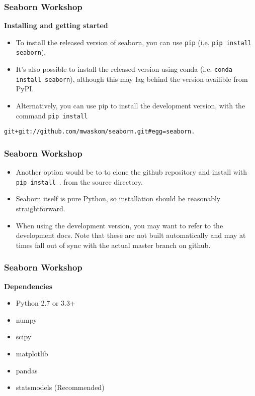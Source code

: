 \documentclass{beamer}
\begin{document}
\begin{frame}[fragile]
\frametitle{Seaborn Workshop}
\large
\textbf{Installing and getting started}
\begin{itemize}
\item To install the released version of seaborn, you can use \texttt{pip} (i.e. \texttt{pip install seaborn}). 
\item It’s also possible to install the released version using conda (i.e. \texttt{conda install seaborn}), although this may lag behind the version availible from PyPI.
\item 
Alternatively, you can use pip to install the development version, with the command \texttt{pip install}
\end{itemize}

\begin{verbatim}
git+git://github.com/mwaskom/seaborn.git#egg=seaborn.
\end{verbatim}  
\end{frame}
\begin{frame}
	\frametitle{Seaborn Workshop}
	\Large
\begin{itemize}
\item Another option would be to to clone the github repository and install with \texttt{pip install }. from the source directory. \item Seaborn itself is pure Python, so installation should be reasonably straightforward.

\item When using the development version, you may want to refer to the development docs. Note that these are not built automatically and may at times fall out of sync with the actual master branch on github.
\end{itemize}

\end{frame}
\begin{frame}
\frametitle{Seaborn Workshop}
\large
\noindent \textbf{Dependencies}
\begin{itemize}
\item Python 2.7 or 3.3+
\item numpy
\item scipy
\item matplotlib
\item pandas

\item statsmodels (Recommended)
\end{itemize}

\end{frame}
\end{document}
